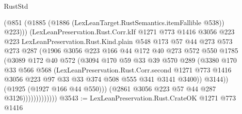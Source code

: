\begin{lexlean}{RustStd}
\begin{coremodule}
                            (@851
                              (@1885 (@1886 (LexLeanTarget.RustSemantics.itemFallible @538)) @223)))
                          (LexLeanPreservation.Rust.Corr.kIf
                            @1271
                            @773
                            @1416
                            @3056
                            @223
                            @223
                            LexLeanPreservation.Rust.Kind.plain
                            @548
                            @173
                            @57
                            @44
                            @273
                            @573
                            @273
                            @287
                            (@1906
                              @3056
                              @223
                              @166
                              @44
                              @172
                              @40
                              @273
                              @572
                              @550
                              @1785
                              (@3089
                                @172
                                @40
                                @572
                                (@3094
                                  @170
                                  @59
                                  @33
                                  @39
                                  @570
                                  @289
                                  (@3380
                                    @170
                                    @33
                                    @566
                                    @568
                                    (LexLeanPreservation.Rust.Corr.second
                                      @1271
                                      @773
                                      @1416
                                      @3056
                                      @223
                                      @97
                                      @33
                                      @33
                                      @374
                                      @508
                                      @555
                                      @341
                                      @3141
                                      @3400))
                                  @3144))
                              (@1925 (@1927 @166 @44 @550)))
                            (@2861 @3056 @223 @57 @44 @287 @3126)))))))))))))
@3543 := LexLeanPreservation.Rust.CrateOK @1271 @773 @1416

\end{coremodule}
\end{lexlean}
